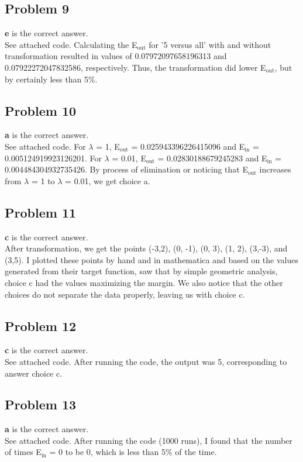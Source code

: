 \documentclass[12 pt]{article}
\begin{document}
	
	\subsection*{Problem 9}
	\textbf{e} is the correct answer. \\
	See attached code. Calculating the E$_{\text{out}}$  for '5 versus all' with and without transformation resulted in values of 0.07972097658196313 and 0.07922272047832586, respectively. Thus, the transformation did lower E$_{\text{out}}$, but by certainly less than 5$\%$.

	
	\subsection*{Problem 10}
	\textbf{a} is the correct answer. \\
	See attached code. For $\lambda$ = 1, E$_{\text{out}}$ = 0.025943396226415096 and  E$_{\text{in}}$ = 0.005124919923126201. For $\lambda$ = 0.01,  E$_{\text{out}}$ = 0.02830188679245283 and E$_{\text{in}}$ = 0.004484304932735426. By process of elimination or noticing that E$_{\text{out}}$ increases from $\lambda$ = 1 to $\lambda$ = 0.01, we get choice a.
	
	\subsection*{Problem 11}
	\textbf{c} is the correct answer. \\
	After transformation, we get the points (-3,2), (0, -1), (0, 3), (1, 2), (3,-3), and (3,5). I plotted these points by hand and in mathematica and based on the values generated from their target function, saw that by simple geometric analysis, choice c had the values maximizing the margin. We also notice that the other choices do not separate the data properly, leaving us with choice c. 
	
	\subsection*{Problem 12}
	\textbf{c} is the correct answer. \\
	See attached code. After running the code, the output was 5, corresponding to answer choice c.
	
	\subsection*{Problem 13}
	\textbf{a} is the correct answer. \\
	See attached code. After running the code (1000 runs), I found that the number of times E$_{\text{in}}$ = 0 to be 0, which is less than 5$\%$ of the time. 
	
\end{document}

